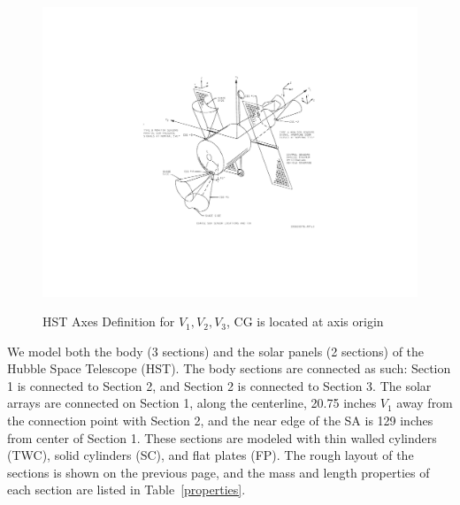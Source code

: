 \documentclass[onecolumn,10pt]{jhwhw}
\begin{document}
\begin{figure}[tbh!]
\begin{center}
\includegraphics[height=0.4\textheight]{hst_axes.pdf}
\label{fig:on}
\end{center}
\caption{HST Axes Definition for $V_1, V_2, V_3$, CG is located at axis origin}
\end{figure}

We model both the body (3 sections) and the solar panels (2 sections) of the Hubble Space Telescope (HST). The body sections are connected as such: Section 1 is connected to Section 2, and Section 2 is connected to Section 3. The solar arrays are connected on Section 1, along the centerline, 20.75 inches $V_1$ away from the connection point with Section 2, and the near edge of the SA is 129 inches from center of Section 1. These sections are modeled with thin walled cylinders (TWC), solid cylinders (SC), and flat plates (FP). The rough layout of the sections is shown on the previous page, and the mass and length properties of each section are listed in Table~\ref{properties}.
\end{document}
